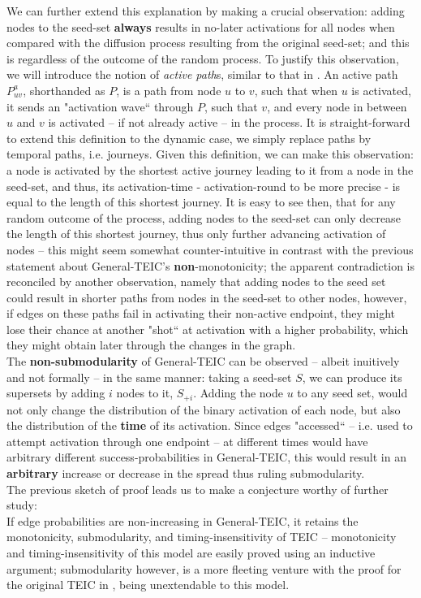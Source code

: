 \documentclass[twocolumn, 10pt]{article}
\begin{document}
We can further extend this explanation by making a crucial observation: adding nodes to the seed-set \textbf{always} results in no-later activations for all nodes when compared with the diffusion process resulting from the original seed-set; and this is regardless of the outcome of the random process. To justify this observation, we will introduce the notion of \textit{active path}s, similar to that in \cite{kempe}. An active path $P^a_{uv}$, shorthanded as $P$, is a path from node $u$ to $v$, such that when $u$ is activated, it sends an "activation wave`` through $P$, such that $v$, and every node in between $u$ and $v$ is activated -- if not already active -- in the process. It is straight-forward to extend this definition to the dynamic case, we simply replace paths by temporal paths, i.e. journeys. Given this definition, we can make this observation: a node is activated by the shortest active journey leading to it from a node in the seed-set, and thus, its activation-time - activation-round to be more precise - is equal to the length of this shortest journey. It is easy to see then, that for any random outcome of the process, adding nodes to the seed-set can only decrease the length of this shortest journey, thus only further advancing activation of nodes -- this might seem somewhat counter-intuitive in contrast with the previous statement about General-TEIC's \textbf{non}-monotonicity; the apparent contradiction is reconciled by another observation, namely that adding nodes to the seed set could result in shorter paths from nodes in the seed-set to other nodes, however, if edges on these paths fail in activating their non-active endpoint, they might lose their chance at another "shot`` at activation with a higher probability, which they might obtain later through the changes in the graph. \\
The \textbf{non-submodularity} of General-TEIC can be observed -- albeit inuitively and not formally -- in the same manner: taking a seed-set $S$, we can produce its supersets by adding $i$ nodes to it, $S_{+i}$. Adding the node $u$ to any seed set, would not only change the distribution of the binary activation of each node, but also the distribution of the \textbf{time} of its activation. Since edges "accessed`` -- i.e. used to attempt activation through one endpoint -- at different times would have arbitrary different success-probabilities in General-TEIC, this would result in an \textbf{arbitrary} increase or decrease in the spread thus ruling submodularity. \\
The previous sketch of proof leads us to make a conjecture worthy of further study:\\
If edge probabilities are non-increasing in General-TEIC, it retains the monotonicity, submodularity, and timing-insensitivity of TEIC -- monotonicity and timing-insensitivity of this model are easily proved using an inductive argument; submodularity however, is a more fleeting venture with the proof for the original TEIC in \cite{gay}, being unextendable to this model. \\
\end{document}
